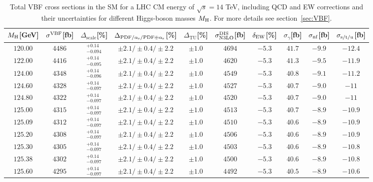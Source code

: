 \begin{table}[ht!]
\caption{Total VBF cross sections in the SM for a LHC CM energy of $\sqrt{s}=14$ TeV, including QCD and EW corrections
and their uncertainties for different Higgs-boson masses $M_\mathrm{H}$. For more details see section~\ref{sec:VBF}.}
\label{tab:vbf_XStot_14}
\begin{center}%
\begin{small}%
\begin{tabular}{cccccccc|cc}%
\toprule
$M_\mathrm{H}$[GeV] & $\sigma^{\mathrm{VBF}}$[fb] & $\Delta_{\mathrm{scale}}$[\%] & $\Delta_{\mathrm{PDF}/\alpha_{\mathrm{s}}/\mathrm{PDF\oplus\alpha_{\mathrm{s}}}}$[\%] & $\Delta_{\mathrm{TU}}$[\%] &
$\sigma_{\mathrm{N3LO}}^{\mathrm{DIS}}$[fb] & $\delta_{\mathrm{EW}}$[\%] & $\sigma_{\gamma}$[fb] & $\sigma_{\mbox{\scriptsize nf}}$[fb] & $\sigma_{\mbox{\scriptsize s/t/u}}$[fb]
\\
\midrule
$120.00$ & $4486$ & $^{+0.14}_{-0.094}$ & $\pm 2.1/\pm 0.4/\pm 2.2$ & $\pm 1.0$ & $4694$ & $-5.3$ & $41.7$ & $-9.9$ & $-12.4$ \\
$122.00$ & $4416$ & $^{+0.14}_{-0.095}$ & $\pm 2.1/\pm 0.4/\pm 2.2$ & $\pm 1.0$ & $4620$ & $-5.3$ & $41.3$ & $-9.5$ & $-11.9$ \\
$124.00$ & $4348$ & $^{+0.14}_{-0.096}$ & $\pm 2.1/\pm 0.4/\pm 2.2$ & $\pm 1.0$ & $4549$ & $-5.3$ & $40.8$ & $-9.1$ & $-11.2$ \\
$124.60$ & $4328$ & $^{+0.14}_{-0.097}$ & $\pm 2.1/\pm 0.4/\pm 2.2$ & $\pm 1.0$ & $4527$ & $-5.3$ & $40.7$ & $-9.0$ & $-11  $ \\
$124.80$ & $4322$ & $^{+0.14}_{-0.097}$ & $\pm 2.1/\pm 0.4/\pm 2.2$ & $\pm 1.0$ & $4520$ & $-5.3$ & $40.7$ & $-9.0$ & $-11  $ \\
$125.00$ & $4315$ & $^{+0.14}_{-0.097}$ & $\pm 2.1/\pm 0.4/\pm 2.2$ & $\pm 1.0$ & $4513$ & $-5.3$ & $40.7$ & $-8.9$ & $-10.9$ \\
$125.09$ & $4312$ & $^{+0.14}_{-0.097}$ & $\pm 2.1/\pm 0.4/\pm 2.2$ & $\pm 1.0$ & $4510$ & $-5.3$ & $40.6$ & $-8.9$ & $-10.9$ \\
$125.20$ & $4308$ & $^{+0.14}_{-0.097}$ & $\pm 2.1/\pm 0.4/\pm 2.2$ & $\pm 1.0$ & $4506$ & $-5.3$ & $40.6$ & $-8.9$ & $-10.9$ \\
$125.30$ & $4305$ & $^{+0.14}_{-0.097}$ & $\pm 2.1/\pm 0.4/\pm 2.2$ & $\pm 1.0$ & $4503$ & $-5.3$ & $40.6$ & $-8.9$ & $-10.8$ \\
$125.38$ & $4302$ & $^{+0.14}_{-0.097}$ & $\pm 2.1/\pm 0.4/\pm 2.2$ & $\pm 1.0$ & $4500$ & $-5.3$ & $40.6$ & $-8.9$ & $-10.8$ \\
$125.60$ & $4295$ & $^{+0.14}_{-0.097}$ & $\pm 2.1/\pm 0.4/\pm 2.2$ & $\pm 1.0$ & $4492$ & $-5.3$ & $40.5$ & $-8.9$ & $-10.6$ \\

\end{tabular}
\end{small}
\end{center}
\end{table}
